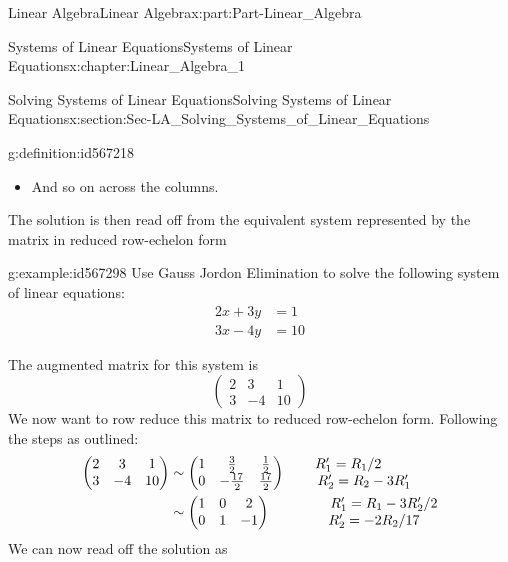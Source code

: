 \documentclass[oneside,10pt,]{book}
\numberwithin{equation}{section}
\newcommand{\amp}{&}
\begin{document}
\begin{partptx}{Linear Algebra}{}{Linear Algebra}{}{}{x:part:Part-Linear_Algebra}
\begin{chapterptx}{Systems of Linear Equations}{}{Systems of Linear Equations}{}{}{x:chapter:Linear_Algebra_1}
\begin{sectionptx}{Solving Systems of Linear Equations}{}{Solving Systems of Linear Equations}{}{}{x:section:Sec-LA_Solving_Systems_of_Linear_Equations}
\begin{definition}{}{g:definition:id567218}
\begin{itemize}[label=\textbullet]
\item{}And so on across the columns.%
\end{itemize}
%
\par
The solution is then read off from the equivalent system represented by the matrix in reduced row-echelon form%
\end{definition}
\begin{example}{}{g:example:id567298}%
Use Gauss Jordon Elimination to solve the following system of linear equations:%
\begin{align*}
2x+3y \amp =1\\
3x-4y \amp =10
\end{align*}
%
\par\smallskip%
\noindent\hypertarget{g:solution:id567279}{}The augmented matrix for this system is%
\begin{equation*}
\begin{pmatrix} 2 \amp 3 \amp 1 \\ 3 \amp -4 \amp 10 \end{pmatrix}
\end{equation*}
We now want to row reduce this matrix to reduced row-echelon form. Following the steps as outlined:%
\begin{align*}
\begin{pmatrix} 2 \amp 3 \amp 1 \\ 3 \amp -4 \amp 10 \end{pmatrix} \amp \sim \begin{pmatrix} 1 \amp \frac{3}{2} \amp \frac{1}{2} \\ 0 \amp -\frac{17}{2} \amp \frac{17}{2} \end{pmatrix}   \begin{matrix} R_1'=R_1/2 \\ \hspace{8mm} R_2'=R_2-3R_1' \end{matrix}\\
\amp \sim \begin{pmatrix} 1 \amp 0 \amp 2 \\ 0 \amp 1 \amp -1 \end{pmatrix}  \begin{matrix} \hspace{15mm} R_1'=R_1-3R_2'/2 \\ \hspace{10mm} R_2'=-2R_2/17 \end{matrix} 
\end{align*}
We can now read off the solution as%
\begin{equation*}

\end{equation*}
\end{example}
\end{sectionptx}
\end{chapterptx}
\end{partptx}
\end{document}
